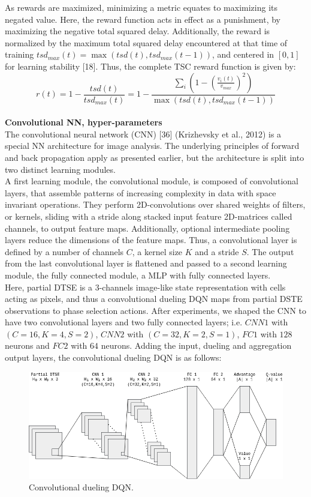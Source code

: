 As rewards are maximized, minimizing a metric equates to maximizing its negated value. Here, the reward function acts in effect as a punishment, by maximizing the negative total squared delay. Additionally, the reward is normalized by the maximum total squared delay encountered at that time of training $tsd_{max}(t) = \max (tsd(t), tsd_{max}(t-1))$, and centered in $[0, 1]$ for learning stability [18]. Thus, the complete TSC reward function is given by:
\[ r(t) = 1 - \frac{tsd(t)}{tsd_{max}(t)} = 1 - \frac{\sum_{i} (1 - (\frac{v_i(t)}{v_{max}})^2)}{\max (tsd(t), tsd_{max}(t-1))}\]
\\
\textbf{Convolutional NN, hyper-parameters} \\
The convolutional neural network (CNN) [36] (Krizhevsky et al., 2012) is a special NN architecture for image analysis. The underlying principles of forward and back propagation apply as presented earlier, but the architecture is split into two distinct learning modules. \\
A first learning module, the convolutional module, is composed of convolutional layers, that assemble patterns of increasing complexity in data with space invariant operations. They perform 2D-convolutions over shared weights of filters, or kernels, sliding with a stride along stacked input feature 2D-matrices called channels, to output feature maps. Additionally, optional intermediate pooling layers reduce the dimensions of the feature maps. Thus, a convolutional layer is defined by a number of channels $C$, a kernel size $K$ and a stride $S$. The output from the last convolutional layer is flattened and passed to a second learning module, the fully connected module, a MLP with fully connected layers. \\
Here, partial DTSE is a 3-channels image-like state representation with cells acting as pixels, and thus a convolutional dueling DQN maps from partial DSTE observations to phase selection actions. After experiments, we shaped the CNN to have two convolutional layers and two fully connected layers; i.e. $CNN1$ with $(C=16,K=4,S=2)$, $CNN2$ with $(C=32,K=2,S=1)$, $FC1$ with $128$ neurons and $FC2$ with $64$ neurons. Adding the input, dueling and aggregation output layers, the convolutional dueling DQN is as follows: \\

\begin{figure}[h]
  \includegraphics[width=\textwidth]{img/II/cnn_dueling.png}
  \centering
  \captionsetup{justification=centering}
  \caption{Convolutional dueling DQN.}
\end{figure}

